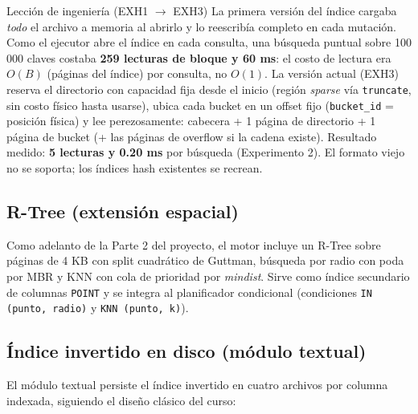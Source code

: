 \documentclass[11pt]{article}
\begin{document}
\begin{cajaclave}{Lección de ingeniería (EXH1 $\to$ EXH3)}
La primera versión del índice cargaba \emph{todo} el archivo a memoria al
abrirlo y lo reescribía completo en cada mutación. Como el ejecutor abre el
índice en cada consulta, una búsqueda puntual sobre 100 000 claves costaba
\textbf{259 lecturas de bloque y 60 ms}: el costo de lectura era $O(B)$
(páginas del índice) por consulta, no $O(1)$. La versión actual (EXH3)
reserva el directorio con capacidad fija desde el inicio (región
\emph{sparse} vía \texttt{truncate}, sin costo físico hasta usarse), ubica
cada bucket en un offset fijo (\texttt{bucket\_id} = posición física) y lee
perezosamente: cabecera + 1 página de directorio + 1 página de bucket
(+ las páginas de overflow si la cadena existe).
Resultado medido: \textbf{5 lecturas y 0.20 ms} por búsqueda (Experimento 2).
El formato viejo no se soporta; los índices hash existentes se recrean.
\end{cajaclave}

\subsection{R-Tree (extensión espacial)}

Como adelanto de la Parte 2 del proyecto, el motor incluye un R-Tree sobre
páginas de 4 KB con split cuadrático de Guttman, búsqueda por radio con
poda por MBR y KNN con cola de prioridad por \emph{mindist}. Sirve como
índice secundario de columnas \texttt{POINT} y se integra al planificador
condicional (condiciones \texttt{IN (punto, radio)} y
\texttt{KNN (punto, k)}).

\subsection{Índice invertido en disco (módulo textual)}

El módulo textual persiste el índice invertido en cuatro archivos por
columna indexada, siguiendo el diseño clásico del curso:
\end{document}
